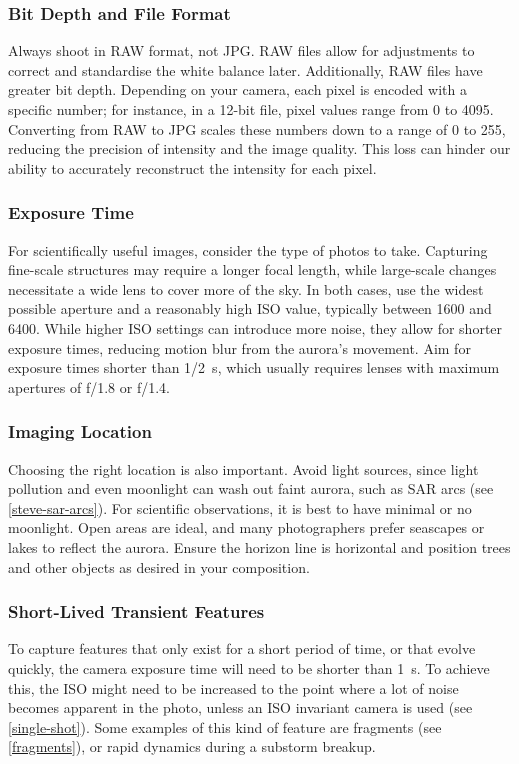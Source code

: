 \documentclass{article}
\begin{document}
\subsubsection{Bit Depth and File Format}
Always shoot in RAW format, not JPG. RAW files allow for adjustments to correct and standardise the white balance later. Additionally, RAW files have greater bit depth. Depending on your camera, each pixel is encoded with a specific number; for instance, in a 12-bit file, pixel values range from 0 to 4095. Converting from RAW to JPG scales these numbers down to a range of 0 to 255, reducing the precision of intensity and the image quality. This loss can hinder our ability to accurately reconstruct the intensity for each pixel.

\subsubsection{Exposure Time}
For scientifically useful images, consider the type of photos to take. Capturing fine-scale structures may require a longer focal length, while large-scale changes necessitate a wide lens to cover more of the sky. In both cases, use the widest possible aperture and a reasonably high ISO value, typically between 1600 and 6400. While higher ISO settings can introduce more noise, they allow for shorter exposure times, reducing motion blur from the aurora's movement. Aim for exposure times shorter than 1/2~s, which usually requires lenses with maximum apertures of f/1.8 or f/1.4.

\subsubsection{Imaging Location}
Choosing the right location is also important. Avoid light sources, since light pollution and even moonlight can wash out faint aurora, such as SAR arcs (see \ref{steve-sar-arcs}). For scientific observations, it is best to have minimal or no moonlight. Open areas are ideal, and many photographers prefer seascapes or lakes to reflect the aurora. Ensure the horizon line is horizontal and position trees and other objects as desired in your composition.

\subsubsection{Short-Lived Transient Features}\label{short-lived-transient-features}
To capture features that only exist for a short period of time, or that evolve quickly, the camera exposure time will need to be shorter than 1~s. To achieve this, the ISO might need to be increased to the point where a lot of noise becomes apparent in the photo, unless an ISO invariant camera is used (see \ref{single-shot}). Some examples of this kind of feature are fragments (see \ref{fragments}), or rapid dynamics during a substorm breakup.
\end{document}
